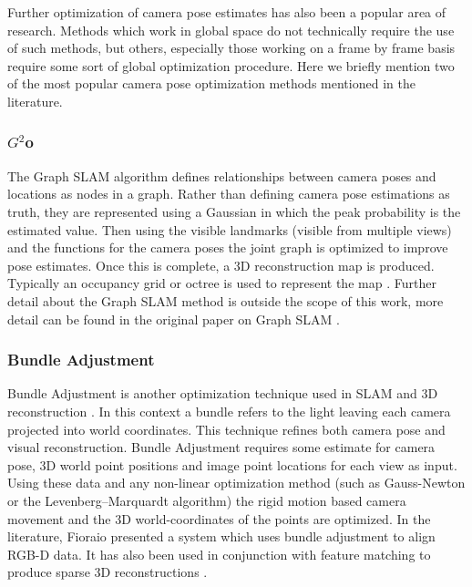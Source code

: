 
Further optimization of camera pose estimates has also been a popular area of research. Methods which work in global space do not technically require the use of such methods, but others, especially those working on a frame by frame basis require some sort of global optimization procedure. Here we briefly mention two of the most popular camera pose optimization methods mentioned in the literature.

\subsubsection{$G^2$o}
\label{Sec:G20}
The Graph SLAM algorithm defines relationships between camera poses and locations as nodes in a graph. Rather than defining camera pose estimations as truth, they are represented using a Gaussian in which the peak probability is the estimated value. Then using the visible landmarks (visible from multiple views) and the functions for the camera poses the joint graph is optimized to improve pose estimates. Once this is complete, a 3D reconstruction map is produced. \\

Typically an occupancy grid or octree is used to represent the map \cite{Wurm10Octomap}. Further detail about the Graph SLAM method is outside the scope of this work, more detail can be found in the original paper on Graph SLAM \cite{Kummerle11G}. \\

\subsubsection{Bundle Adjustment}
\label{sec:ba}
Bundle Adjustment is another optimization technique used in SLAM and 3D reconstruction \cite{Lourakis09Sba}. In this context a bundle refers to the light leaving each camera projected into world coordinates. This technique refines both camera pose and visual reconstruction. Bundle Adjustment requires some estimate for camera pose, 3D world point positions and image point locations for each view as input. \\

Using these data and any non-linear optimization method (such as Gauss-Newton or the Levenberg–Marquardt algorithm) the rigid motion based camera movement and the 3D world-coordinates of the points are optimized. In the literature, Fioraio \cite{Fioraio11Realtime} presented a system which uses bundle adjustment to align RGB-D data. It has also been used in conjunction with feature matching to produce sparse 3D reconstructions \cite{Klein07Parallel,Agarwal09Building}.
